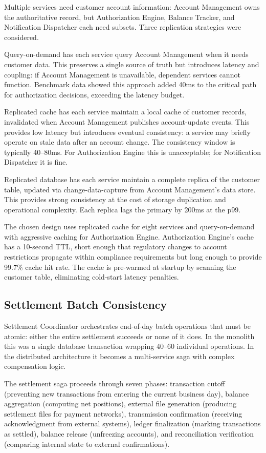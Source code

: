 Multiple services need customer account information: Account Management owns the authoritative record, but Authorization Engine, Balance Tracker, and Notification Dispatcher each need subsets. Three replication strategies were considered.

Query-on-demand has each service query Account Management when it needs customer data. This preserves a single source of truth but introduces latency and coupling: if Account Management is unavailable, dependent services cannot function. Benchmark data showed this approach added 40ms to the critical path for authorization decisions, exceeding the latency budget.

Replicated cache has each service maintain a local cache of customer records, invalidated when Account Management publishes account-update events. This provides low latency but introduces eventual consistency: a service may briefly operate on stale data after an account change. The consistency window is typically 40--80ms. For Authorization Engine this is unacceptable; for Notification Dispatcher it is fine.

Replicated database has each service maintain a complete replica of the customer table, updated via change-data-capture from Account Management's data store. This provides strong consistency at the cost of storage duplication and operational complexity. Each replica lags the primary by 200ms at the p99.

The chosen design uses replicated cache for eight services and query-on-demand with aggressive caching for Authorization Engine. Authorization Engine's cache has a 10-second TTL, short enough that regulatory changes to account restrictions propagate within compliance requirements but long enough to provide 99.7\% cache hit rate. The cache is pre-warmed at startup by scanning the customer table, eliminating cold-start latency penalties.

\subsection{Settlement Batch Consistency}

Settlement Coordinator orchestrates end-of-day batch operations that must be atomic: either the entire settlement succeeds or none of it does. In the monolith this was a single database transaction wrapping 40--60 individual operations. In the distributed architecture it becomes a multi-service saga with complex compensation logic.

The settlement saga proceeds through seven phases: transaction cutoff (preventing new transactions from entering the current business day), balance aggregation (computing net positions), external file generation (producing settlement files for payment networks), transmission confirmation (receiving acknowledgment from external systems), ledger finalization (marking transactions as settled), balance release (unfreezing accounts), and reconciliation verification (comparing internal state to external confirmations).

